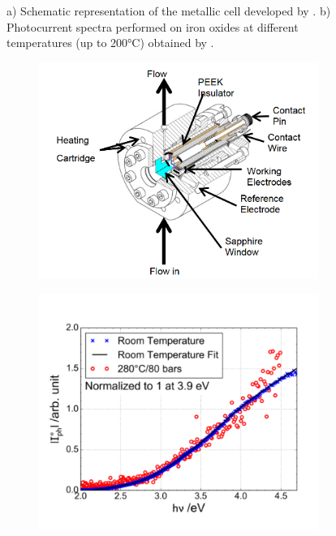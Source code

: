 \begin{figure}[h]
\begin{subfigure}{\coef\textwidth}
            \caption{}
            \label{fig:bojinov_ht_b}
        \end{subfigure}
        
        \caption{a) Schematic representation of the metallic cell developed
        by \citet{bojinov2002}. 
        b) Photocurrent spectra performed on iron oxides at different 
        temperatures (up to 200°C) obtained by \citet{bojinov2002}.}
        \label{fig:bojinov_ht}
    \end{figure}



    \renewcommand{\coef}{0.45}
    \begin{figure}[h]
        \centering
        \begin{subfigure}{\coef\textwidth}
            \centering
            \includegraphics[width=\textwidth]{./src/figures/skocic2015-1.png}
            \caption{}
            \label{fig:skocic_phd_cell}
        \end{subfigure}
        \begin{subfigure}{\coef\textwidth}
            \centering
            \includegraphics[width=\textwidth]{./src/figures/skocic2015-2.png}

\end{subfigure}
\end{figure}
